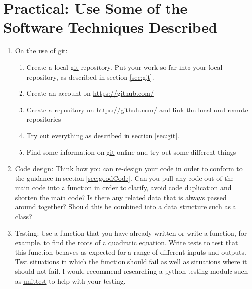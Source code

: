 %
\clearpage{}


\section{Practical: Use Some of the Software Techniques Described}
\begin{enumerate}
\item On the use of \url{git}:

\begin{enumerate}
\item Create a local \url{git} repository. Put your work so far into your
local repository, as described in section \ref{sec:git}.
\item Create an account on \url{https://github.com/} 
\item Create a repository on \url{https://github.com/} and link the local
and remote repositories
\item Try out everything as described in section \ref{sec:git}.
\item Find some information on \url{git} online and try out some different
things
\end{enumerate}
\item Code design: Think how you can re-design your code in order to conform
to the guidance in section \ref{sec:goodCode}. Can you pull any code
out of the main code into a function in order to clarify, avoid code
duplication and shorten the main code? Is there any related data that
is always passed around together? Should this be combined into a data
structure such as a class?
\item Testing: Use a function that you have already written or write a function,
for example, to find the roots of a quadratic equation. Write tests
to test that this function behaves as expected for a range of different
inputs and outputs. Test situations in which the function should fail
as well as situations where it should not fail. I would recommend
researching a python testing module such as \url{unittest} to help
with your testing.%
\end{enumerate}

